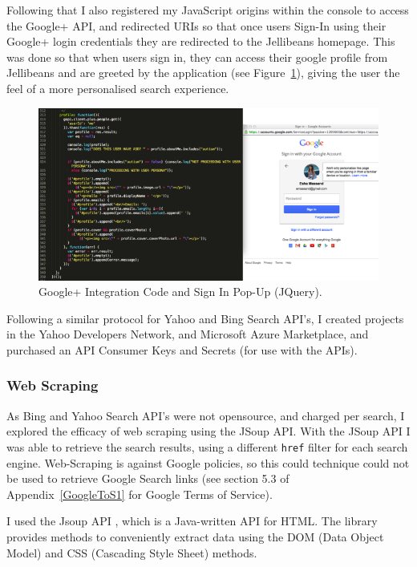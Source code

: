 \documentclass[a4paper, 11pt]{article}
\begin{document}
Following that I also registered my JavaScript origins within the console to access the Google+ API, and redirected URIs so that once users Sign-In using their Google+ login credentials they are redirected to the Jellibeans homepage. This was done so that when users sign in, they can access their google profile from Jellibeans and are greeted by the application (see Figure~\ref{GoogleSignInPage}), giving the user the feel of a more personalised search experience. 

\begin{figure}[H]
\begin{center}
\includegraphics[scale=0.65]{aboutme}
\end{center}
\caption{Google+ Integration Code and Sign In Pop-Up (JQuery).}
\label{GoogleSignInPage}
\end{figure}

Following a similar protocol for Yahoo and Bing Search API's, I created projects in the Yahoo Developers Network, and Microsoft Azure Marketplace, and purchased an API Consumer Keys and Secrets (for use with the APIs). 

\subsubsection{Web Scraping}
As Bing and Yahoo Search API's were not opensource, and charged per search, I explored the efficacy of web scraping using the JSoup API. With the JSoup API I was able to retrieve the search results, using a different  \texttt{href} filter for each search engine. Web-Scraping is against Google policies, so this could technique could not be used to retrieve Google Search links (see section 5.3 of Appendix~\ref{GoogleToS1} for Google Terms of Service). 

\vspace{5mm}
I used the Jsoup API \cite{jsoup}, which is a Java-written API for HTML. The library provides methods to conveniently extract data using the DOM (Data Object Model) and CSS (Cascading Style Sheet) methods. 
\end{document}
